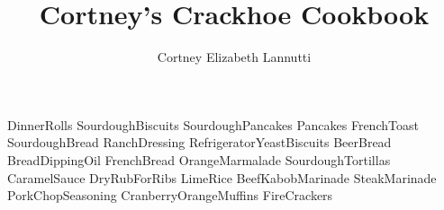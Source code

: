 \documentclass[a4paper, titlepage]{book}
\title{Cortney's Crackhoe Cookbook}
\author{Cortney Elizabeth Lannutti}
\date{}
\begin{document}
\maketitle
{}
\tableofcontents
\newpage
{}

{DinnerRolls}
{SourdoughBiscuits}
{SourdoughPancakes}
{Pancakes}
{FrenchToast}
{SourdoughBread}
{RanchDressing}
{RefrigeratorYeastBiscuits}
{BeerBread}
{BreadDippingOil}
{FrenchBread}
{OrangeMarmalade}
{SourdoughTortillas}
{CaramelSauce}
{DryRubForRibs}
{LimeRice}
{BeefKabobMarinade}
{SteakMarinade}
{PorkChopSeasoning}
{CranberryOrangeMuffins}
{FireCrackers}
\end{document}
